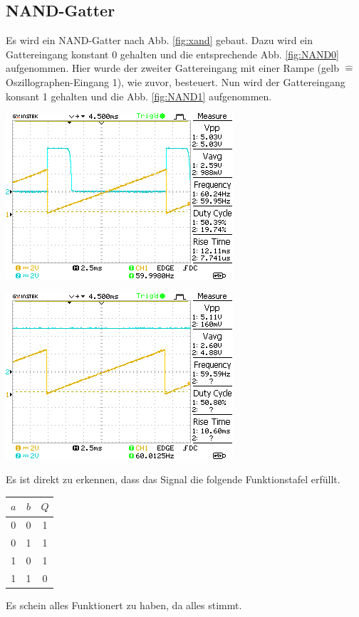 \documentclass[10pt]{article}
\newenvironment{Figure}
  {\par\medskip\noindent\minipage{\linewidth}}
  {\endminipage\par\medskip}
\begin{document}
\begin{multicols}{2}
	\subsection{NAND-Gatter}
	Es wird ein NAND-Gatter nach Abb. \ref{fig:xand} gebaut. Dazu wird ein Gattereingang konstant 0 gehalten und die entsprechende Abb. \ref{fig:NAND0} aufgenommen. Hier wurde der zweiter Gattereingang mit einer Rampe (gelb $\hat{=}$ Oszillographen-Eingang 1), wie zuvor, besteuert. Nun wird der Gattereingang konsant 1 gehalten und die Abb. \ref{fig:NAND1} aufgenommen.
	\begin{Figure}
		\centering\includegraphics{../data/DS0005.png}
		\label{fig:NAND0}
	\end{Figure}
	\begin{Figure}
		\centering\includegraphics{../data/DS0006.png}
		\label{fig:NAND1}
	\end{Figure}
	Es ist direkt zu erkennen, dass das Signal die folgende Funktionstafel erfüllt.
	\begin{center}
		\begin{tabular}{|c|c|c|}
			\hline
			$a$ & $b$ & $Q$ \\
			\hline
			0   & 0   & 1   \\
			0   & 1   & 1   \\
			1   & 0   & 1   \\
			1   & 1   & 0   \\
			\hline
		\end{tabular}
	\end{center}
	Es schein alles Funktionert zu haben, da alles stimmt.

\end{multicols}
\end{document}
